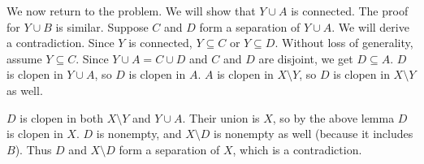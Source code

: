 We now return to the problem. We will show that $Y \cup A$ is connected. The proof for $Y \cup B$ is similar. Suppose $C$ and $D$ form a separation of $Y \cup A$. We will derive a contradiction. Since $Y$ is connected, $Y \subseteq C$ or $Y \subseteq D$. Without loss of generality, assume $Y \subseteq C$. Since $Y \cup A = C \cup D$ and $C$ and $D$ are disjoint, we get $D \subseteq A$. $D$ is clopen in $Y \cup A$, so $D$ is clopen in $A$. $A$ is clopen in $X \setminus Y$, so $D$ is clopen in $X \setminus Y$ as well.

$D$ is clopen in both $X \setminus Y$ and $Y \cup A$. Their union is $X$, so by the above lemma $D$ is clopen in $X$. $D$ is nonempty, and $X \setminus D$ is nonempty as well (because it includes $B$). Thus $D$ and $X \setminus D$ form a separation of $X$, which is a contradiction.
